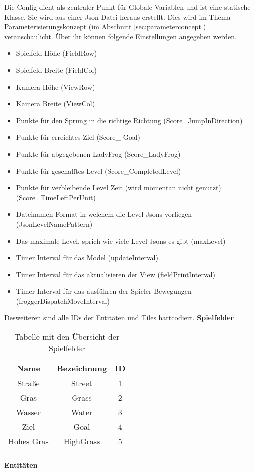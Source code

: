 \documentclass[a4paper,10pt]{report}
\begin{document}
{{{				Die Config dient als zentraler Punkt für Globale Variablen und ist eine statische Klasse.
				Sie wird aus einer Json Datei heraus erstellt. Dies wird im Thema Parameterisierungskonzept (im Abschnitt \ref{sec:parameterconcept}) veranschaulicht. 
				\newline \newline
				\noindent				
				Über ihr können folgende Einstellungen angegeben werden.
				
				\begin{itemize}
					\item Spielfeld Höhe (FieldRow)
					\item Spielfeld Breite (FieldCol)
					\item Kamera Höhe (ViewRow)
					\item Kamera Breite (ViewCol)
					\item Punkte für den Sprung in die richtige Richtung (Score\_JumpInDirection)
					\item Punkte für erreichtes Ziel (Score\_ Goal)
					\item Punkte für abgegebenen LadyFrog (Score\_LadyFrog)
					\item Punkte für geschafftes Level (Score\_CompletedLevel)
					\item Punkte für verbleibende Level Zeit (wird momentan nicht genutzt)\\(Score\_TimeLeftPerUnit)
					\item Dateinamen Format in welchem die Level Jsons vorliegen\\(JsonLevelNamePattern)
					\item Das maximale Level, sprich wie viele Level Jsons es gibt (maxLevel)
					\item Timer Interval für das Model (updateInterval)
					\item Timer Interval für das aktualisieren der View (fieldPrintInterval)
					\item Timer Interval für das ausführen der Spieler Bewegungen\\(froggerDispatchMoveInterval)
				\end{itemize}	
											
				\newpage
				\noindent
				Desweiteren sind alle IDs der Entitäten und Tiles hartcodiert.
				\newline \newline	
				\noindent
				\textbf{Spielfelder}				
				
				\begin{longtable}{|c|c|c|}
				\hline
				\textbf{Name}	& \textbf{Bezeichnung}	& \textbf{ID} \\
				\hline				
				Straße 			& Street 				& 1 \\
				\hline
				Gras 			& Grass 				& 2 \\
				\hline
				Wasser 			& Water 				& 3 \\
				\hline
				Ziel 			& Goal 					& 4 \\
				\hline
				Hohes Gras		& HighGrass 			& 5 \\
				\hline			
				\caption{Tabelle mit den Übersicht der Spielfelder}
				\end{longtable}		
				\noindent
				\textbf{Entitäten}				
				
}}}
\end{document}
